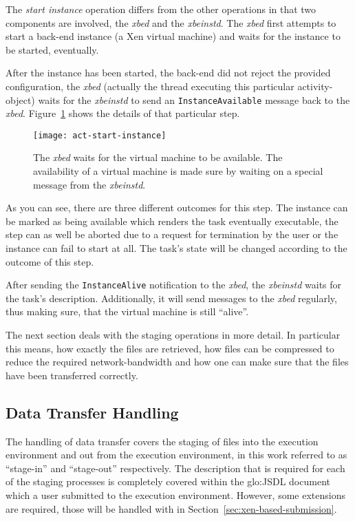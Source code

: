 The \emph{start  instance} operation differs from the  other operations in
that two components are involved, the \emph{xbed} and the \emph{xbeinstd}.
The \emph{xbed}  first attempts  to start a  back-end instance (\eg  a Xen
virtual machine) and waits for the instance to be started, eventually.

After the instance  has been started, \ie the back-end  did not reject the
provided  configuration, the  \emph{xbed} (actually  the  thread executing
this particular activity-object) waits  for the \emph{xbeinstd} to send an
\texttt{Instance\-Available}        message       back        to       the
\emph{xbed}. Figure~\ref{fig:act-start-instance} shows the details of that
particular step.

\begin{figure}[ht]
  \centering
  \texttt{[image: act-start-instance]}
  \caption[Start Instance Activity]{The  \emph{xbed} waits for the virtual
    machine to  be available.   The availability of  a virtual  machine is
    made sure by waiting on a special message from the \emph{xbeinstd}.}
  \label{fig:act-start-instance}
\end{figure}

As you  can see,  there are  three different outcomes  for this  step. The
instance  can  be  marked  as  being  available  which  renders  the  task
eventually executable,  the step can as  well be aborted due  to a request
for termination by the user or the  instance can fail to start at all. The
task's state will be changed according to the outcome of this step.

After   sending   the   \texttt{Instance\-Alive}   notification   to   the
\emph{xbed},  the  \emph{xbeinstd}   waits  for  the  task's  description.
Additionally,  it will send  messages to  the \emph{xbed}  regularly, thus
making sure, that the virtual machine is still ``alive''.

The  next section deals  with the  staging operations  in more  detail. In
particular this means, how exactly  the files are retrieved, how files can
be compressed  to reduce  the required network-bandwidth  and how  one can
make sure that the files have been transferred correctly.

\subsection{Data Transfer Handling}
\label{sec:xbed:data-transfer}

The  handling  of data  transfer  covers the  staging  of  files into  the
execution environment and out from the execution environment, in this work
referred   to  as  ``stage-in''   and  ``stage-out''   respectively.   The
description  that  is  required  for  each of  the  staging  processes  is
completely  covered  within  the  \gls{glo:JSDL} document  which  a  user
submitted  to the  execution  environment.  However,  some extensions  are
required,       those       will       be      handled       with       in
Section~\ref{sec:xen-based-submission}.

